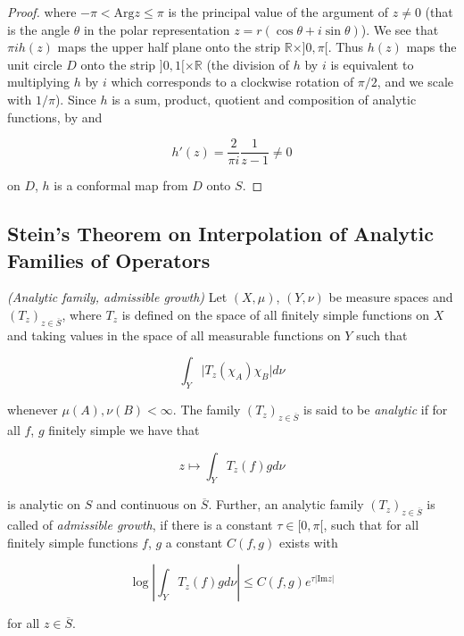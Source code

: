 \begin{proof}
where $-\pi < \mathrm{Arg} z \leqslant \pi$ is the principal value of the argument of $z \neq 0$ (that is the angle $\theta$ in the polar representation $z = r\left( \cos \theta + i \sin \theta \right)$). We see that $\pi i h(z)$ maps the upper half plane onto the strip $\mathbb{R} \times ]0,\pi[$. Thus $h(z)$ maps the unit circle $D$ onto the strip $]0,1[ \times \mathbb{R}$ (the division of $h$ by $i$ is equivalent to multiplying $h$ by $i$ which corresponds to a clockwise rotation of $\pi/2$, and we scale with $1/\pi$). Since $h$ is a sum, product, quotient and composition of analytic functions, by \cite[278--279]{rudin:rc_analysis:1987} and

\begin{equation}
	h'(z) = \frac{2}{\pi i} \frac{1}{z - 1} \neq 0
\end{equation}

on $D$, $h$ is a conformal map from $D$ onto $S$.

\end{proof}

\subsection{Stein's Theorem on Interpolation of Analytic Families of Operators}

\begin{mdframed}
	\begin{definition}\emph{(Analytic family, admissible growth)}
		Let $(X,\mu)$, $(Y,\nu)$ be measure spaces and $\left( T_z \right)_{z \in \overline{S}}$, where $T_z$ is defined on the space of all finitely simple functions on $X$ and taking values in the space of all measurable functions on $Y$ such that

		\begin{equation}
			\int_Y \vert T_z(\chi_A)\chi_B \vert d\nu
		\end{equation}

		whenever $\mu(A),\nu(B) < \infty$. The family $\left( T_z \right)_{z \in \overline{S}}$ is said to be \emph{analytic} if for all $f$, $g$ finitely simple we have that

		\begin{equation}
			z \mapsto \int_Y T_z(f)gd\nu
		\end{equation}

		is analytic on $S$ and continuous on $\overline{S}$. Further, an analytic family $\left( T_z \right)_{z \in \overline{S}}$ is called of \emph{admissible growth}, if there is a constant $\tau \in [0,\pi[$, such that for all finitely simple functions $f$, $g$ a constant $C(f,g)$ exists with

			\begin{equation}
				\log\left\vert \int_Y T_z(f) g d\nu\right\vert \leqslant C(f,g)e^{\tau\vert \mathrm{Im}z\vert}
			\end{equation}

			for all $z \in \overline{S}$.
	\end{definition}
\end{mdframed}


